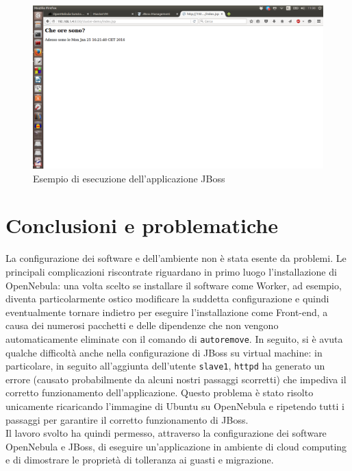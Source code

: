 \documentclass[twoside]{article}
\begin{document}
\begin{figure}[!tbp]
\centering
\includegraphics[width=13cm]{immagine2.png}
\caption{Esempio di esecuzione dell'applicazione JBoss}\label{fig:2}
\end{figure}

\section{Conclusioni e problematiche}
La configurazione dei software e dell'ambiente non è stata esente da problemi.
Le principali complicazioni riscontrate riguardano in primo luogo l'installazione di OpenNebula:
una volta scelto se installare il software come Worker, ad esempio, diventa particolarmente
ostico modificare la suddetta configurazione e quindi eventualmente tornare indietro per 
eseguire l'installazione come Front-end, a causa dei numerosi pacchetti e delle dipendenze che non vengono
automaticamente eliminate con il comando di \texttt{autoremove}. In seguito, si è avuta qualche difficoltà
anche nella configurazione di JBoss su virtual machine: in particolare, in seguito all'aggiunta
dell'utente \texttt{slave1}, \texttt{httpd} ha generato un errore
(causato probabilmente da alcuni nostri passaggi scorretti) che impediva il corretto
funzionamento dell'applicazione.
Questo problema è stato risolto unicamente ricaricando l'immagine di Ubuntu su OpenNebula e
ripetendo tutti i passaggi per garantire il corretto funzionamento di JBoss. \\
Il lavoro svolto ha quindi permesso, attraverso la configurazione dei software OpenNebula e JBoss, di
eseguire un'applicazione in ambiente di cloud computing e di dimostrare le proprietà di tolleranza ai guasti
e migrazione.


\printbibliography
\end{document}
